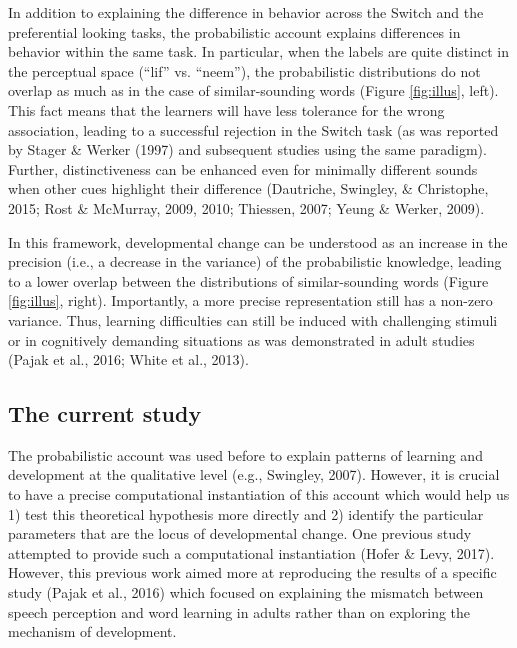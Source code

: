 \documentclass[english,,man]{apa6}
\begin{document}
In addition to explaining the difference in behavior across the Switch and the preferential looking tasks, the probabilistic account explains differences in behavior within the same task. In particular, when the labels are quite distinct in the perceptual space (\enquote{lif} vs. \enquote{neem}), the probabilistic distributions do not overlap as much as in the case of similar-sounding words (Figure \ref{fig:illus}, left). This fact means that the learners will have less tolerance for the wrong association, leading to a successful rejection in the Switch task (as was reported by Stager \& Werker (1997) and subsequent studies using the same paradigm). Further, distinctiveness can be enhanced even for minimally different sounds when other cues highlight their difference (Dautriche, Swingley, \& Christophe, 2015; Rost \& McMurray, 2009, 2010; Thiessen, 2007; Yeung \& Werker, 2009).

In this framework, developmental change can be understood as an increase in the precision (i.e., a decrease in the variance) of the probabilistic knowledge, leading to a lower overlap between the distributions of similar-sounding words (Figure \ref{fig:illus}, right). Importantly, a more precise representation still has a non-zero variance. Thus, learning difficulties can still be induced with challenging stimuli or in cognitively demanding situations as was demonstrated in adult studies (Pajak et al., 2016; White et al., 2013).

\hypertarget{the-current-study}{%
\subsection{The current study}\label{the-current-study}}

The probabilistic account was used before to explain patterns of learning and development at the qualitative level (e.g., Swingley, 2007). However, it is crucial to have a precise computational instantiation of this account which would help us 1) test this theoretical hypothesis more directly and 2) identify the particular parameters that are the locus of developmental change. One previous study attempted to provide such a computational instantiation (Hofer \& Levy, 2017). However, this previous work aimed more at reproducing the results of a specific study (Pajak et al., 2016) which focused on explaining the mismatch between speech perception and word learning in adults rather than on exploring the mechanism of development.
\end{document}
